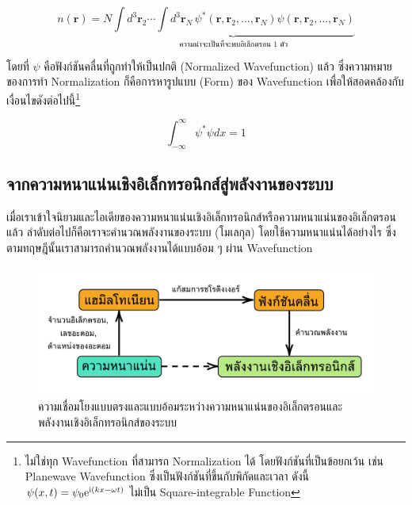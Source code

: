 \begin{equation}\label{eq:elec_density_all}
    n(\bm{r}) = N \underbrace{\int {d}^{3} \bm{r}_{2} \cdots \int {d}^{3} \bm{r}_{N} \, 
                \psi^*(\bm{r}, \bm{r}_{2}, \dots, \bm{r}_{N}) \psi(\bm{r}, \bm{r}_2, 
                \dots, \bm{r}_N)}_{\textstyle \text{ความน่าจะเป็นที่จะพบอิเล็กตรอน 1 ตัว}}
\end{equation}

\noindent โดยที่ $\psi$ คือฟังก์ชันคลื่นที่ถูกทำให้เป็นปกติ (Normalized Wavefunction) แล้ว ซึ่งความหมายของการทำ Normalization 
ก็คือการหารูปแบบ (Form) ของ Wavefunction เพื่อให้สอดคล้องกับเงื่อนไขดังต่อไปนี้\footnote{ไม่ใช่ทุก Wavefunction ที่สามารถ 
Normalization ได้ โดยฟังก์ชันที่เป็นข้อยกเว้น เช่น Planewave Wavefunction ซึ่งเป็นฟังก์ชันที่ขึ้นกับพิกัดและเวลา ดังนี้ $\psi(x,t) = 
\psi_0 {\rm e}^{ {\rm i} (k x-\omega t)}$ ไม่เป็น Square-integrable Function}

\begin{equation}\label{eq:square_integrable}
    \int^\infty_{-\infty} \psi^* \psi dx = 1
\end{equation}

\subsection{จากความหนาแน่นเชิงอิเล็กทรอนิกส์สู่พลังงานของระบบ}
\label{ssec:ener_density}

เมื่อเราเข้าใจนิยามและไอเดียของความหนาแน่นเชิงอิเล็กทรอนิกส์หรือความหนาแน่นของอิเล็กตรอนแล้ว ลำดับต่อไปก็คือเราจะคำนวณพลังงานของระบบ
(โมเลกุล) โดยใช้ความหนาแน่นได้อย่างไร ซึ่งตามทฤษฎีนั้นเราสามารถคำนวณพลังงานได้แบบอ้อม ๆ ผ่าน Wavefunction 

\begin{figure}[htbp]
    \centering
    \includegraphics[width=\linewidth]{fig/density_wavefunc_ener.png}
    \caption{ความเชื่อมโยงแบบตรงและแบบอ้อมระหว่างความหนาแน่นของอิเล็กตรอนและพลังงานเชิงอิเล็กทรอนิกส์ของระบบ}
    \label{fig:density_wavefunc_ener}
\end{figure}

